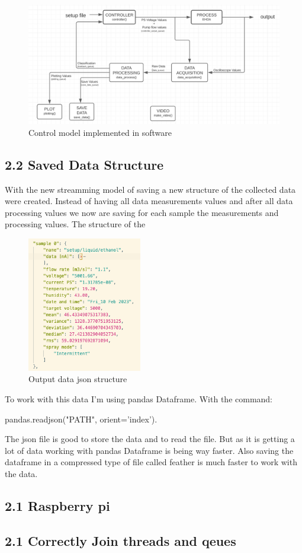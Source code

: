     \begin{figure}[H]
        \center
        \includegraphics[width=18cm]{images/image_folder_report_4/new_system_design.png}
        \caption{Control model implemented in software}
    \end{figure}


\subsection*{2.2 Saved Data Structure}

    With the new streamming model of saving a new structure of the collected data were created.
    Instead of having all data measurements values and after all data processing values we now are saving for each sample the measurements and processing values.
    The structure of the 

    \begin{figure}[H]
        \center
        \includegraphics[width=5cm]{images/image_folder_report_4/json_structure.png}
        \caption{Output data json structure}
    \end{figure}

    To work with this data I'm using pandas Dataframe.
    With the command:
    
    pandas.read\textunderscore{}json("PATH", orient='index').

    The json file is good to store the data and to read the file. But as it is getting a lot of data working with pandas Dataframe is being way faster. Also saving the dataframe in a compressed
    type of file called feather is much faster to work with the data.


\subsection*{2.1 Raspberry pi}


\subsection*{2.1 Correctly Join threads and qeues}
